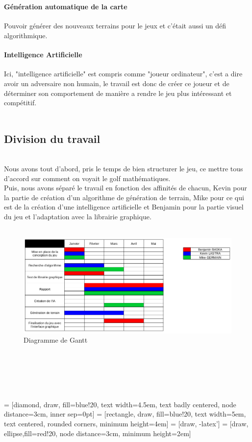 \documentclass{article}
\begin{document}
\\~\\
\textbf{\large Génération automatique de la carte}
\\~\\
Pouvoir générer des nouveaux terrains pour le jeux et c'était aussi un défi algorithmique.
\\~\\
\textbf{\large Intelligence Artificielle}
\\~\\
Ici, "intelligence artificielle" est compris comme "joueur ordinateur", c'est a dire avoir un adversaire non humain, le travail est donc de créer ce joueur et de déterminer son comportement de manière a rendre le jeu plus intéressant et compétitif.
\\~\\
\newpage
\subsection{Division du travail}
~\\
Nous avons tout d'abord, pris le temps de bien structurer le jeu, ce mettre tous d'accord sur comment on voyait le golf mathématiques.\\
Puis, nous avons séparé le travail en fonction des affinités de chacun, Kevin pour la partie de création d'un algorithme de génération de terrain, Mike pour ce qui est de la création d'une intelligence artificielle et Benjamin pour la partie visuel du jeu et l'adaptation avec la librairie graphique.
\\~\\
\begin{figure}[!h]
\centering
\includegraphics[scale=0.3]{Images/driagram.png}
\caption{Diagramme de Gantt}
\end{figure}
~\\~\\~\\~\\~\\
 = [diamond, draw, fill=blue!20, 
    text width=4.5em, text badly centered, node distance=3cm, inner sep=0pt]
 = [rectangle, draw, fill=blue!20, 
    text width=5em, text centered, rounded corners, minimum height=4em]
 = [draw, -latex']
 = [draw, ellipse,fill=red!20, node distance=3cm,
    minimum height=2em]
\end{document}
